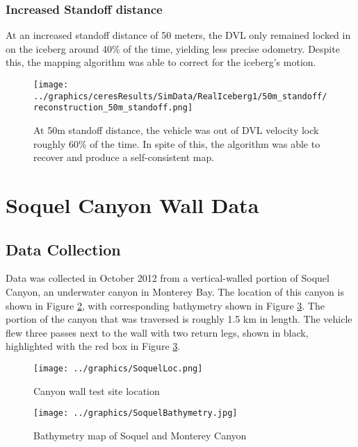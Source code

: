 \subsubsection{Increased Standoff distance}

At an increased standoff distance of 50 meters, the DVL only remained locked in on the iceberg around 40\% of the time, yielding less precise odometry. Despite this, the mapping algorithm was able to correct for the iceberg's motion.

 \begin{figure}[!htb]
   \centering
   \texttt{[image: ../graphics/ceresResults/SimData/RealIceberg1/50m\_standoff/reconstruction\_50m\_standoff.png]} %
   \caption{At 50m standoff distance, the vehicle was out of DVL velocity lock roughly 60\% of the time. In spite of this, the algorithm was able to recover and produce a self-consistent map.}
   \label{fig:FullSim50m}
\end{figure}


\clearpage
\section{Soquel Canyon Wall Data}

\subsection{Data Collection}

Data was collected in October 2012 from a vertical-walled portion of Soquel Canyon, an underwater canyon in Monterey Bay. The location of this canyon is shown in Figure \ref{fig:SoquelLoc}, with corresponding bathymetry shown in Figure \ref{fig:SoquelBathy}. The portion of the canyon that was traversed is roughly 1.5 km in length. The vehicle flew three passes next to the wall with two return legs, shown in black, highlighted with the red box in Figure \ref{fig:SoquelBathy}.

 \begin{figure}[!htb]
   \centering
   \texttt{[image: ../graphics/SoquelLoc.png]} %
   \caption{Canyon wall test site location}
   \label{fig:SoquelLoc}
\end{figure}

 \begin{figure}[!htb]
   \centering
   \texttt{[image: ../graphics/SoquelBathymetry.jpg]} %
   \caption{Bathymetry map of Soquel and Monterey Canyon}
   \label{fig:SoquelBathy}
\end{figure}

